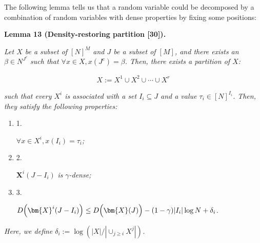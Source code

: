 The following lemma tells us that a random variable could be decomposed by a combination of random variables with dense properties by fixing some positions:\par





\par\medskip\noindent\textbf{
\textbf{Lemma 13}\textbf{ }(Density-restoring partition [30])\textbf{.}
}\par



\emph{Let $X$ be a subset of $[N]^{M}$ and $J$ be a subset of $[M]$, and there exists an $\beta\in N^{J^{c}}$ such that $\forall x\in X,x(J^{c})=\beta$. Then, there exists a partition of $X$:}\par


\[\begin{gathered}
X:=X^{1}\cup X^{2}\cup\cdots\cup X^{r}
\end{gathered}\]


\emph{such that every $X^{i}$ is associated with a set $I_{i}\subseteq J$ and a value $\tau_{i}\in[N]^{I_{i}}$. Then, they satisfy the following properties:}\par


\begin{enumerate}


\item[] 
1. 


$\forall x\in X^{i},x({I_{i}})=\tau_{i}$\emph{;}\par





\item[] 
2. 


$\bm{X}^{i}(J-I_{i})$\emph{ is }$\gamma$\emph{-dense;}\par





\item[] 
3. 


$D\Big{(}\bm{X}^{i}(J-I_{i})\Big{)}\leq D\Big{(}\bm{X}(J)\Big{)}-(1-\gamma)|I_{i}|\log N+\delta_{i}$\emph{.}\par





\end{enumerate}


\emph{Here, we define $\delta_{i}:=\log(|X|/|\cup_{j\geq i}X^{j}|)$.}\par



